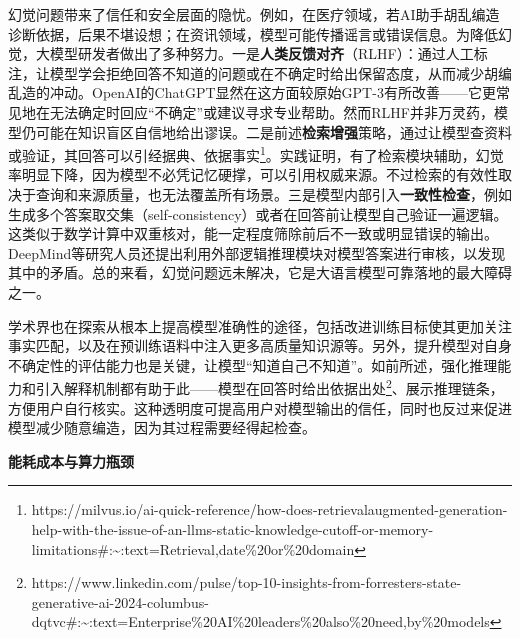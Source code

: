\documentclass[
  letterpaper,
]{scrbook}
\begin{document}
幻觉问题带来了信任和安全层面的隐忧。例如，在医疗领域，若AI助手胡乱编造诊断依据，后果不堪设想；在资讯领域，模型可能传播谣言或错误信息。为降低幻觉，大模型研发者做出了多种努力。一是\textbf{人类反馈对齐}（RLHF）：通过人工标注，让模型学会拒绝回答不知道的问题或在不确定时给出保留态度，从而减少胡编乱造的冲动。OpenAI的ChatGPT显然在这方面较原始GPT-3有所改善------它更常见地在无法确定时回应``不确定''或建议寻求专业帮助。然而RLHF并非万灵药，模型仍可能在知识盲区自信地给出谬误。二是前述\textbf{检索增强}策略，通过让模型查资料或验证，其回答可以引经据典、依据事实\footnote{https://milvus.io/ai-quick-reference/how-does-retrievalaugmented-generation-help-with-the-issue-of-an-llms-static-knowledge-cutoff-or-memory-limitations\#:\textasciitilde:text=Retrieval,date\%20or\%20domain}。实践证明，有了检索模块辅助，幻觉率明显下降，因为模型不必凭记忆硬撑，可以引用权威来源。不过检索的有效性取决于查询和来源质量，也无法覆盖所有场景。三是模型内部引入\textbf{一致性检查}，例如生成多个答案取交集（self-consistency）或者在回答前让模型自己验证一遍逻辑。这类似于数学计算中双重核对，能一定程度筛除前后不一致或明显错误的输出。DeepMind等研究人员还提出利用外部逻辑推理模块对模型答案进行审核，以发现其中的矛盾。总的来看，幻觉问题远未解决，它是大语言模型可靠落地的最大障碍之一。

学术界也在探索从根本上提高模型准确性的途径，包括改进训练目标使其更加关注事实匹配，以及在预训练语料中注入更多高质量知识源等。另外，提升模型对自身不确定性的评估能力也是关键，让模型``知道自己不知道''。如前所述，强化推理能力和引入解释机制都有助于此------模型在回答时给出依据出处\footnote{https://www.linkedin.com/pulse/top-10-insights-from-forresters-state-generative-ai-2024-columbus-dqtvc\#:\textasciitilde:text=Enterprise\%20AI\%20leaders\%20also\%20need,by\%20models}、展示推理链条，方便用户自行核实。这种透明度可提高用户对模型输出的信任，同时也反过来促进模型减少随意编造，因为其过程需要经得起检查。

\textbf{能耗成本与算力瓶颈}
\end{document}
